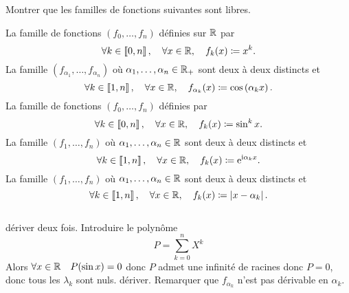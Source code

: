 \documentclass{magnolia}
\begin{document}
Montrer que les familles de fonctions suivantes sont libres.
\begin{questions}
\question La famille de fonctions $(f_0,\ldots,f_n)$ définies sur $\mathbb{R}$ par
  \[\forall k\in\left\llbracket 0,n\right\rrbracket ,\quad \forall x\in\mathbb{R} ,\quad f_k(x)\coloneqq x^k.\]
\question La famille $(f_{\alpha_1},\ldots,f_{\alpha_n})$
  où $\alpha_1,\ldots,\alpha_n\in\mathbb{R}_+$ sont deux à deux distincts et
  \[\forall k\in\left\llbracket 1,n\right\rrbracket ,\quad \forall x\in\mathbb{R} ,\quad
    f_{\alpha_k}(x)\coloneqq \cos\left(\alpha_k x\right).\]
\question La famille de fonctions $(f_0,\ldots,f_n)$ définies par
  \[\forall k\in\left\llbracket 0,n\right\rrbracket ,\quad \forall x\in\mathbb{R} ,\quad f_k(x)\coloneqq \sin^k x.\]
\question La famille $(f_1,\ldots,f_n)$ où
  $\alpha_1,\ldots,\alpha_n\in\mathbb{R}$ sont deux à deux distincts et
  \[\forall k\in\left\llbracket 1,n\right\rrbracket ,\quad \forall x\in\mathbb{R} ,\quad
    f_{k}(x)\coloneqq {\rm e}^{{\rm i} \alpha_k x}.\]
\question La famille $(f_{1},\ldots,f_{n})$ où
  $\alpha_1,\ldots,\alpha_n\in\mathbb{R}$ sont deux à deux distincts et
  \[\forall k\in\left\llbracket 1,n\right\rrbracket ,\quad \forall x\in\mathbb{R} ,\quad
    f_{k}(x)\coloneqq\left|x-\alpha_k\right|.\]
\end{questions}
\begin{sol}
$\quad$
\begin{questions}
\question   
\question dériver deux fois.
\question Introduire le polynôme
  \[P=\sum_{k=0}^n X^k\]
  Alors $\forall x\in\mathbb{R} \quad P(\sin x)=0$ donc $P$ admet une infinité de
  racines donc $P=0$, donc tous les $\lambda_k$ sont nuls.
\question dériver.
\question Remarquer que $f_{\alpha_k}$ n'est pas dérivable en $\alpha_k$.
\end{questions}
\end{sol}


\end{document}
